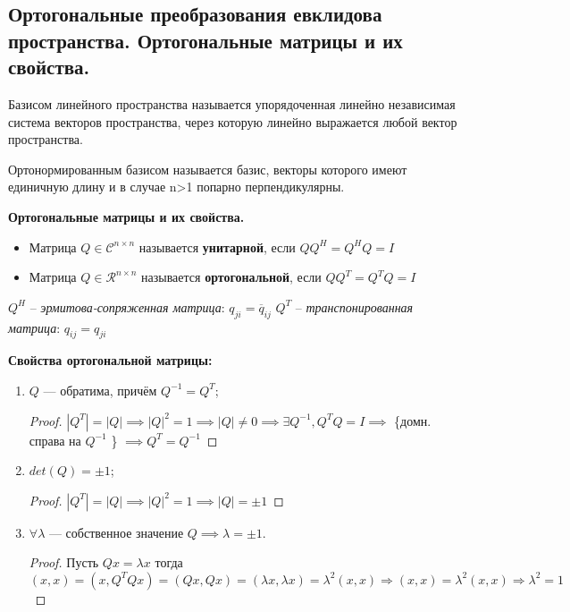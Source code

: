 \subsection{Ортогональные преобразования евклидова пространства. Ортогональные матрицы и их свойства.}

Базисом линейного пространства называется упорядоченная линейно независимая система векторов пространства, через которую линейно выражается любой вектор пространства. 

Ортонормированным базисом называется
базис, векторы которого имеют единичную длину и в случае n>1 попарно перпендикулярны. 

\textbf{Ортогональные матрицы и их свойства.}
\begin{itemize}
    \item Матрица $Q \in \mathcal{C}^{n \times n}$ называется \textbf{унитарной}, если \newline $QQ^H = Q^HQ=I$
    \item Матрица $Q \in \mathcal{R}^{n \times n}$ называется \textbf{ортогональной}, если \newline $QQ^T = Q^TQ=I$
 
\end{itemize}   

$Q^H$ -- \textit{эрмитова-сопряженная матрица}: $q_{ji} = \overline{q}_{ij}$   \newline
$Q^T$ -- \textit{транспонированная матрица}: $q_{ij} = q_{ji}$

\textbf{Свойства ортогональной матрицы:}
    \begin{enumerate}
        \item $Q$ --- обратима, причём $Q^{-1}=Q^T$;
        
        \begin{proof}
        $\left|Q^T\right|=\left|Q\right| \implies \left|Q\right|^2 = 1 \implies \left|Q\right| \neq 0 \implies \exists Q^{-1}, Q^TQ=I \implies$ \{домн. справа на $Q^{-1}$ \} $\implies Q^T=Q^{-1}$
        \end{proof}
        
        \item $det(Q) = \pm1$;
        
        \begin{proof}
        $\left|Q^T\right|=\left|Q\right| \implies \left|Q\right|^2 = 1 \implies \left|Q\right| = \pm 1$
        \end{proof}
        
        \item $\forall \lambda$ --- собственное значение $Q\implies \lambda=\pm1$.
        \begin{proof}
        Пусть $Qx=\lambda x$ тогда $(x,x)=(x,Q^TQx) = (Qx,Qx) = (\lambda x,\lambda x) = \lambda^2(x,x) \Rightarrow (x,x) = \lambda^2(x,x) \Rightarrow \lambda^2 = 1$

        \end{proof}
    \end{enumerate}
 
